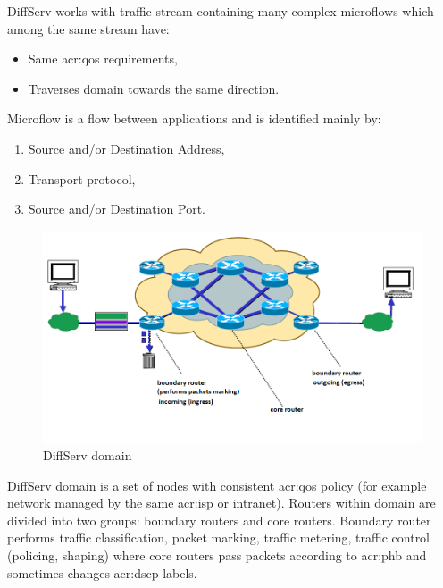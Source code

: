 \documentclass[11pt,openany]{book}
\begin{document}
        DiffServ works with traffic stream containing many complex microflows which among the same stream have:

        \begin{itemize}
          \item Same \gls{acr:qos} requirements,
          \item Traverses domain towards the same direction.
        \end{itemize}

        Microflow is a flow between applications and is identified mainly by:

        \begin{enumerate}
          \item Source and/or Destination Address,
          \item Transport protocol,
          \item Source and/or Destination Port.
        \end{enumerate}

        \begin{figure}[h]
          \begin{center}
            \includegraphics[width=.7\textwidth]{img/qos/diffserv.png}
          \end{center}


          \caption{DiffServ domain \cite{qos2}}
        \end{figure}

        DiffServ domain is a set of nodes with consistent \gls{acr:qos} policy (for example network managed by the same
        \gls{acr:isp} or intranet). Routers within domain are divided into two groups: boundary routers and core
        routers. Boundary router performs traffic classification, packet marking, traffic metering, traffic control
        (policing, shaping) where core routers pass packets according to \gls{acr:phb} and sometimes changes
        \gls{acr:dscp} labels. \cite{qos2}
\end{document}
